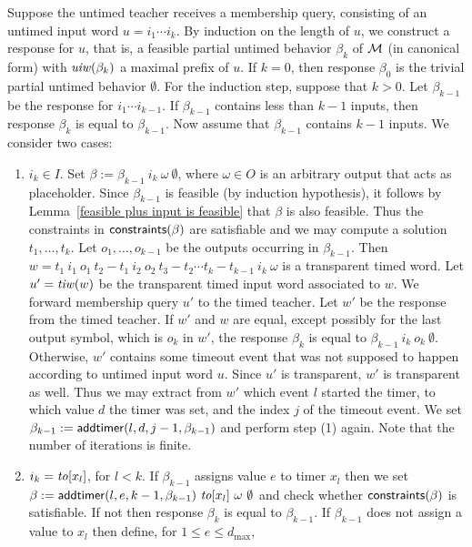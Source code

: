 Suppose the untimed teacher receives a membership query, consisting of an untimed input word
$u = i_1 \cdots i_k$.
By induction on the length of $u$, 
we construct a response for $u$, that is, a feasible partial untimed behavior $\beta_k$ of ${\mathcal M}$ (in canonical form)
with $\mathit{uiw}(\beta_k)$ a maximal prefix of $u$.
If $k=0$, then response $\beta_0$ is the trivial partial untimed behavior $\emptyset$.
For the induction step, suppose that $k>0$.
Let $\beta_{k-1}$ be the response for $i_1 \cdots i_{k-1}$.
If $\beta_{k-1}$ contains less than $k-1$ inputs, then response $\beta_k$ is equal to $\beta_{k-1}$.
Now assume that $\beta_{k-1}$ contains $k-1$ inputs. We consider two cases:
\begin{enumerate}
\item
$i_k \in I$. Set $\beta := \beta_{k-1} ~ i_k ~ \omega ~ \emptyset$, where $\omega \in O$ is an arbitrary output that acts as placeholder.
Since $\beta_{k-1}$ is feasible (by induction hypothesis), it follows by Lemma~\ref{feasible plus input is feasible} that
$\beta$ is also feasible.
Thus the constraints in $\mathsf{constraints}({\beta})$ are satisfiable and we may compute a solution $t_1 ,\ldots, t_k$.
Let $o_1 ,\ldots, o_{k-1}$ be the outputs occurring in $\beta_{k-1}$. Then
$w = t_1 ~ i_1 ~ o_1 ~ t_2 - t_1 ~ i_2 ~ o_2 ~ t_3- t_2 \cdots t_k - t_{k-1} ~ i_k ~ \omega$ is a transparent timed word.
Let $u' = \mathit{tiw}(w)$ be the transparent timed input word associated to $w$.
We forward membership query $u'$ to the timed teacher.
Let $w'$ be the response from the timed teacher.
If $w'$ and $w$ are equal, except possibly for the last output symbol, which is $o_k$ in $w'$,
the response $\beta_k$ is equal to $\beta_{k-1} ~ i_k ~ o_k ~ \emptyset$.
Otherwise, $w'$ contains some timeout event that was not supposed to happen according to untimed input word $u$.
Since $u'$ is transparent, $w'$ is transparent as well. Thus we may extract from $w'$ which event $l$ started the timer, to which value
$d$ the timer was set, and the index $j$ of the timeout event.
We set $\beta_{k-1} := \mathsf{addtimer}({l,d,j-1,\beta_{k-1}})$ and perform step (1) again. 
Note that the number of iterations is finite.
\item
$i_k = \mathit{to}[x_l]$, for $l < k$.
If $\beta_{k-1}$ assigns value $e$ to timer $x_l$ then
we set $\beta := \mathsf{addtimer}({l,e,k-1,\beta_{k-1}}) ~ \mathit{to}[x_l] ~ \omega ~ \emptyset$ and check whether $\mathsf{constraints}({\beta})$ is
satisfiable. If not then response $\beta_k$ is equal to $\beta_{k-1}$.
If $\beta_{k-1}$ does not assign a value to $x_l$ then define, for $1 \leq e \leq d_{\max}$,

\end{enumerate}
